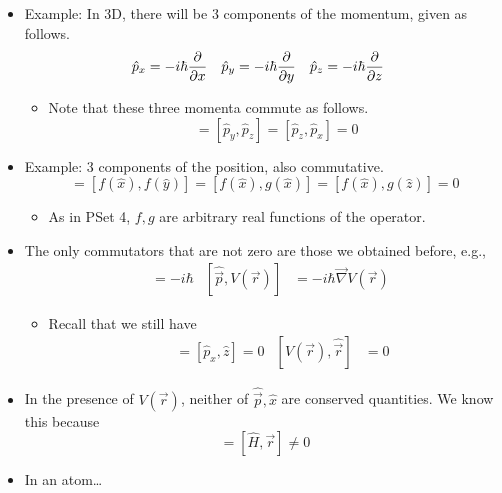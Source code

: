 \documentclass[../notes.tex]{subfiles}
\begin{document}
\begin{itemize}
    \item Example: In 3D, there will be 3 components of the momentum, given as follows.
    \begin{align*}
        \hat{p}_x &= -i\hbar\pdv{x}&
        \hat{p}_y &= -i\hbar\pdv{y}&
        \hat{p}_z &= -i\hbar\pdv{z}
    \end{align*}
    \begin{itemize}
        \item Note that these three momenta commute as follows.
        \begin{equation*}
            [\hat{p}_x,\hat{p}_y] = [\hat{p}_y,\hat{p}_z]
            = [\hat{p}_z,\hat{p}_x]
            = 0
        \end{equation*}
    \end{itemize}
    \item Example: 3 components of the position, also commutative.
    \begin{equation*}
        [\hat{x},\hat{y}] = [f(\hat{x}),f(\hat{y})]
        = [f(\hat{x}),g(\hat{x})]
        = [f(\hat{x}),g(\hat{z})]
        = 0
    \end{equation*}
    \begin{itemize}
        \item As in PSet 4, $f,g$ are arbitrary real functions of the operator.
    \end{itemize}
    \item The only commutators that are not zero are those we obtained before, e.g.,
    \begin{align*}
        [\hat{p}_x,\hat{x}] &= -i\hbar&
        [\hat{\vec{p}},V(\vec{r})] &= -i\hbar\vec{\nabla}V(\vec{r})
    \end{align*}
    \begin{itemize}
        \item Recall that we still have
        \begin{align*}
            [\hat{p}_x,\hat{y}] &= [\hat{p}_x,\hat{z}] = 0&
            [V(\vec{r}),\hat{\vec{r}}] &= 0
        \end{align*}
    \end{itemize}
    \item In the presence of $V(\vec{r})$, neither of $\hat{\vec{p}},\hat{x}$ are conserved quantities. We know this because
    \begin{equation*}
        [\hat{H},\vec{p}] = [\hat{H},\vec{r}] \neq 0
    \end{equation*}
    \item In an atom\dots
    \begin{itemize}

\end{itemize}
\end{itemize}
\end{document}
